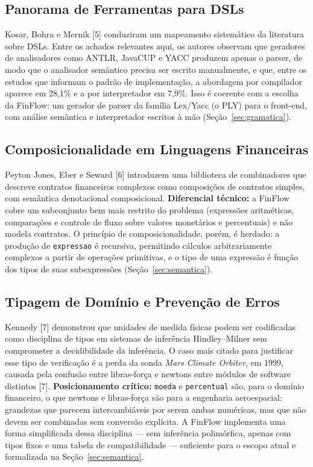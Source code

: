 \documentclass[conference]{IEEEtran}
\begin{document}
\subsection{Panorama de Ferramentas para DSLs}

Kosar, Bohra e Mernik [5] conduziram um mapeamento sistemático da literatura sobre DSLs. Entre os achados relevantes aqui, os autores observam que geradores de analisadores como ANTLR, JavaCUP e YACC produzem apenas o parser, de modo que o analisador semântico precisa ser escrito manualmente, e que, entre os estudos que informam o padrão de implementação, a abordagem por compilador aparece em 28,1\% e a por interpretador em 7,9\%. Isso é coerente com a escolha da FinFlow: um gerador de parser da família Lex/Yacc (o PLY) para o front-end, com análise semântica e interpretador escritos à mão (Seção~\ref{sec:gramatica}).

\subsection{Composicionalidade em Linguagens Financeiras}

Peyton Jones, Eber e Seward [6] introduzem uma biblioteca de combinadores que descreve contratos financeiros complexos como composições de contratos simples, com semântica denotacional composicional. \textbf{Diferencial técnico:} a FinFlow cobre um subconjunto bem mais restrito do problema (expressões aritméticas, comparações e controle de fluxo sobre valores monetários e percentuais) e não modela contratos. O princípio de composicionalidade, porém, é herdado: a produção de \texttt{expressao} é recursiva, permitindo cálculos arbitrariamente complexos a partir de operações primitivas, e o tipo de uma expressão é função dos tipos de suas subexpressões (Seção~\ref{sec:semantica}).

\subsection{Tipagem de Domínio e Prevenção de Erros}
\label{sec:tipagem}

Kennedy [7] demonstrou que unidades de medida físicas podem ser codificadas como disciplina de tipos em sistemas de inferência Hindley--Milner sem comprometer a decidibilidade da inferência. O caso mais citado para justificar esse tipo de verificação é a perda da sonda \textit{Mars Climate Orbiter}, em 1999, causada pela confusão entre libras-força e newtons entre módulos de software distintos [7]. \textbf{Posicionamento crítico:} \texttt{moeda} e \texttt{percentual} são, para o domínio financeiro, o que newtons e libras-força são para a engenharia aeroespacial: grandezas que parecem intercambiáveis por serem ambas numéricas, mas que não devem ser combinadas sem conversão explícita. A FinFlow implementa uma forma simplificada dessa disciplina --- sem inferência polimórfica, apenas com tipos fixos e uma tabela de compatibilidade --- suficiente para o escopo atual e formalizada na Seção~\ref{sec:semantica}.
\end{document}
